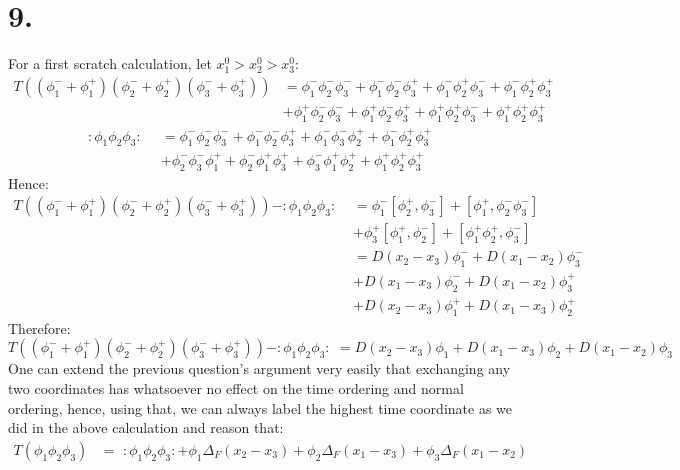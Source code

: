 \documentclass{article}
\newcommand{\phionep}{\phi_1^+}
\newcommand{\phionem}{\phi_1^-}
\newcommand{\phitwop}{\phi_2^+}
\newcommand{\phitwom}{\phi_2^-}
\newcommand{\phithreep}{\phi_3^+}
\newcommand{\phithreem}{\phi_3^-}
\begin{document}
\section*{9.}
For a first scratch calculation, let $x_1^0>x_2^0>x_3^0$:
\begin{equation}
    \begin{split}
        T\left( (\phionem+\phionep)(\phitwom + \phitwop)(\phithreem + \phithreep)\right) &= \phionem\phitwom\phithreem + \phionem\phitwom\phithreep + \phionem\phitwop\phithreem+\phionem\phitwop\phithreep \\
        &+ \phionep\phitwom\phithreem + \phionep\phitwom\phithreep + \phionep\phitwop\phithreem+\phionep\phitwop\phithreep
    \end{split}
\end{equation}
\begin{equation}
    \begin{split}
        :\phi_1\phi_2\phi_3: \,\,\, &= \phionem\phitwom\phithreem + \phionem\phitwom\phithreep+\phionem\phithreem\phitwop + \phionem\phitwop\phithreep \\ 
        & + \phitwom\phithreem\phionep + \phitwom\phionep\phithreep + \phithreem\phionep\phitwop + \phionep\phitwop\phithreep
    \end{split}
\end{equation}
Hence:
\begin{equation}
    \begin{split}
        T\left( (\phionem+\phionep)(\phitwom + \phitwop)(\phithreem + \phithreep)\right) - :\phi_1\phi_2\phi_3:\,\, &= \phionem[\phitwop,\phithreem] + [\phionep,\phitwom\phithreem] \\ &+ \phithreep[\phionep,\phitwom]+ [\phionep\phitwop,\phithreem]\\
        &=D(x_2-x_3)\phionem  + D(x_1-x_2)\phithreem \\ & + D(x_1-x_3)\phitwom + D(x_1-x_2)\phithreep \\ & + D(x_2-x_3)\phionep+D(x_1-x_3)\phitwop
    \end{split}
\end{equation}
Therefore:
\begin{equation}
     T\left( (\phionem+\phionep)(\phitwom + \phitwop)(\phithreem + \phithreep)\right) - :\phi_1\phi_2\phi_3:\,\, = D(x_2-x_3)\phi_1 +  D(x_1-x_3)\phi_2+D(x_1-x_2)\phi_3
\end{equation}
One can extend the previous question's argument very easily that exchanging any two coordinates has whatsoever no effect on the time ordering and normal ordering, hence, using that, we can always label the highest time coordinate as we did in the above calculation and reason that:
\begin{equation}
    \begin{split}
        T\left( \phi_1\phi_2\phi_3\right) &=\,\, :\phi_1\phi_2\phi_3: + \phi_1\Delta_F(x_2-x_3) +  \phi_2\Delta_F(x_1-x_3)+\phi_3\Delta_F(x_1-x_2)
    \end{split}
\end{equation}
\end{document}
